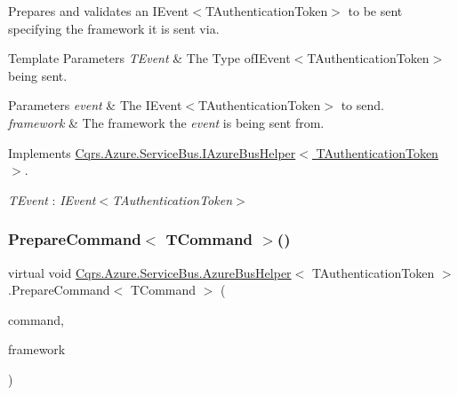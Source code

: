 Prepares and validates an I\+Event$<$\+T\+Authentication\+Token$>$ to be sent specifying the framework it is sent via. 


\begin{DoxyTemplParams}{Template Parameters}
{\em T\+Event} & The Type ofI\+Event$<$\+T\+Authentication\+Token$>$ being sent.\\
\hline
\end{DoxyTemplParams}

\begin{DoxyParams}{Parameters}
{\em event} & The I\+Event$<$\+T\+Authentication\+Token$>$ to send.\\
\hline
{\em framework} & The framework the {\itshape event}  is being sent from.\\
\hline
\end{DoxyParams}


Implements \hyperlink{interfaceCqrs_1_1Azure_1_1ServiceBus_1_1IAzureBusHelper_ac5cbeb6e8bbdb1a98501f0b746c12abd_ac5cbeb6e8bbdb1a98501f0b746c12abd}{Cqrs.\+Azure.\+Service\+Bus.\+I\+Azure\+Bus\+Helper$<$ T\+Authentication\+Token $>$}.

\begin{Desc}
\item[Type Constraints]\begin{description}
\item[{\em T\+Event} : {\em I\+Event$<$T\+Authentication\+Token$>$}]\end{description}
\end{Desc}
\mbox{\label{classCqrs_1_1Azure_1_1ServiceBus_1_1AzureBusHelper_abdcc74e09f97a259f16d04e2af454002_abdcc74e09f97a259f16d04e2af454002}} 
\subsubsection{\texorpdfstring{Prepare\+Command$<$ T\+Command $>$()}{PrepareCommand< TCommand >()}}
{\footnotesize\ttfamily virtual void \hyperlink{classCqrs_1_1Azure_1_1ServiceBus_1_1AzureBusHelper}{Cqrs.\+Azure.\+Service\+Bus.\+Azure\+Bus\+Helper}$<$ T\+Authentication\+Token $>$.Prepare\+Command$<$ T\+Command $>$ (\begin{DoxyParamCaption}\item[{T\+Command}]{command,  }\item[{string}]{framework }\end{DoxyParamCaption})\hspace{0.3cm}{\ttfamily [virtual]}}



